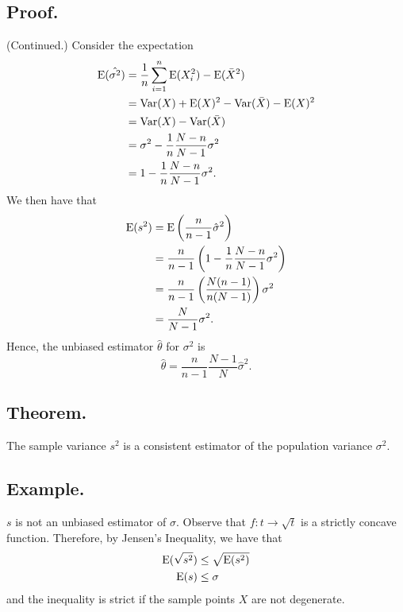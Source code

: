 \documentclass[titlepage]{article}
\begin{document}
\subsection{Proof.} (Continued.) Consider the expectation 
\begin{align*}
    \text{E}(\hat{\sigma^{2}}) &= \frac{1}{n}\sum_{i=1}^{n}\text{E}(X_{i}^{2}) - \text{E}(\bar{X}^{2}) \\
                         &= \text{Var}(X) + \text{E}(X)^{2} - \text{Var}(\bar{X}) - \text{E}(X)^{2} \\
                         &= \text{Var}(X) - \text{Var}(\bar{X}) \\
                         &= \sigma^{2} - \frac{1}{n}\frac{N-n}{N-1}\sigma^{2} \\
                         &= 1 - \frac{1}{n}\frac{N-n}{N-1}\sigma^{2}.
\end{align*}
We then have that 
\begin{align*}
    \text{E}(s^{2}) &= \text{E}\left(\frac{n}{n-1}\hat{\sigma}^{2}\right) \\
              &= \frac{n}{n-1}\left(1 - \frac{1}{n}\frac{N-n}{N-1}\sigma^{2}\right) \\
              &= \frac{n}{n-1}\left(\frac{N(n-1)}{n(N-1)}\right)\sigma^{2} \\
              &= \frac{N}{N-1}\sigma^{2}.
\end{align*}
Hence, the unbiased estimator $\hat{\theta}$ for $\sigma^{2}$ is
$$\hat{\theta} = \frac{n}{n-1}\frac{N-1}{N}\hat{\sigma}^{2}.$$

\subsection{Theorem.} The sample variance $s^{2}$ is a consistent estimator of the population variance $\sigma^{2}$.

\subsection{Example.} $s$ is not an unbiased estimator of $\sigma$. Observe that $f: t \to \sqrt{t}$ is a strictly concave function. Therefore, by Jensen's Inequality, we have that
\begin{align*}
    \text{E}(\sqrt{s^{2}}) &\leq \sqrt{\text{E}(s^{2})} \\
               \text{E}(s) &\leq \sigma
\end{align*}
and the inequality is strict if the sample points $X$ are not degenerate.

\newpage {}
\end{document}
